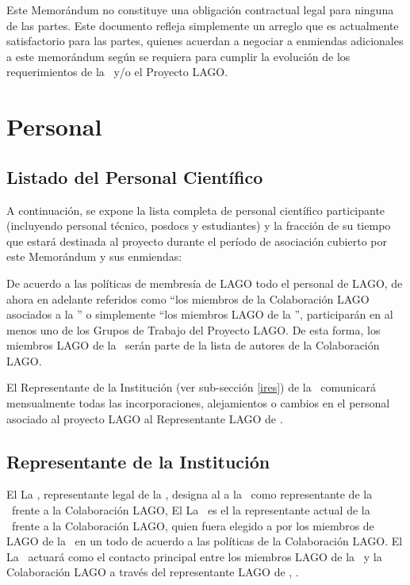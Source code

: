 Este Memorándum no constituye una obligación contractual legal para ninguna de
las partes. Este documento refleja simplemente un arreglo que es actualmente
satisfactorio para las partes, quienes acuerdan a negociar a enmiendas
adicionales a este memorándum según se requiera para cumplir la evolución de
los requerimientos de la \institution~y/o el Proyecto LAGO.

\section{Personal}

\subsection{Listado del Personal Científico}

A continuación, se expone la lista completa de personal científico participante
(incluyendo personal técnico, posdocs y estudiantes) y la fracción de su tiempo
que estará destinada al proyecto durante el período de asociación cubierto por
este Memorándum y sus enmiendas:



De acuerdo a las políticas de membresía de LAGO todo el personal de LAGO, de
ahora en adelante referidos como ``los miembros de la Colaboración LAGO
asociados a la \institution'' o simplemente ``los miembros LAGO de la
\institution'', participarán en al menos uno de los Grupos de Trabajo del
Proyecto LAGO. De esta forma, los miembros LAGO de la \institution~serán parte
de la lista de autores de la Colaboración LAGO.

El Representante de la Institución (ver sub-sección \ref{ires}) de la
\institution~comunicará mensualmente todas las incorporaciones, alejamientos o
cambios en el personal asociado al proyecto LAGO al Representante LAGO de
\country.

\subsection{Representante de la Institución\label{ires}}

\ifil 
\ifilg El \else La \fi \instlegalrep, representante legal de la \institution, designa \ifirg al \else a la \fi \instrep~como representante de la \institution~frente a la Colaboración LAGO, 
\else
\ifirg El \else La \fi \instrep~es
\ifirg el \else la \fi representante actual de la
\institution~frente a la Colaboración LAGO,
\fi
quien fuera elegid\ifirg o \else a \fi por los miembros de
LAGO de la \institution~en un todo de acuerdo a las políticas de la
Colaboración LAGO. \ifirg El \else La \fi \instrep~actuará como el
contacto principal entre los miembros LAGO de la \institution~y la Colaboración
LAGO a través del representante LAGO de \country, \countryrep.

